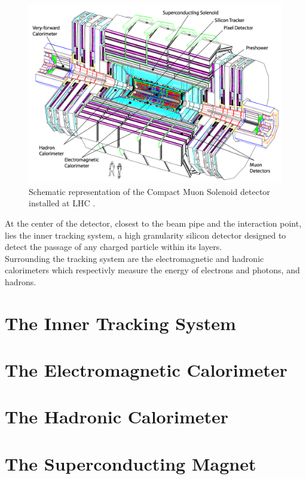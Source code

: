     \begin{figure}[h!]
      \centering
      \includegraphics[width=\textwidth]{img/I-3-cms/cms.png}
      \caption{Schematic representation of the Compact Muon Solenoid detector installed at LHC \cite{1748-0221-3-08-S08004}.}
      \label{fig:I-3-cms-global-view}
    \end{figure}

    At the center of the detector, closest to the beam pipe and the interaction point, lies the inner tracking system, a high granularity silicon detector designed to detect the passage of any charged particle within its layers. \\

    Surrounding the tracking system are the electromagnetic and hadronic calorimeters which respectivly measure the energy of electrons and photons, and hadrons. 


  \section{The Inner Tracking System}

  \section{The Electromagnetic Calorimeter}

  \section{The Hadronic Calorimeter}

  \section{The Superconducting Magnet}

